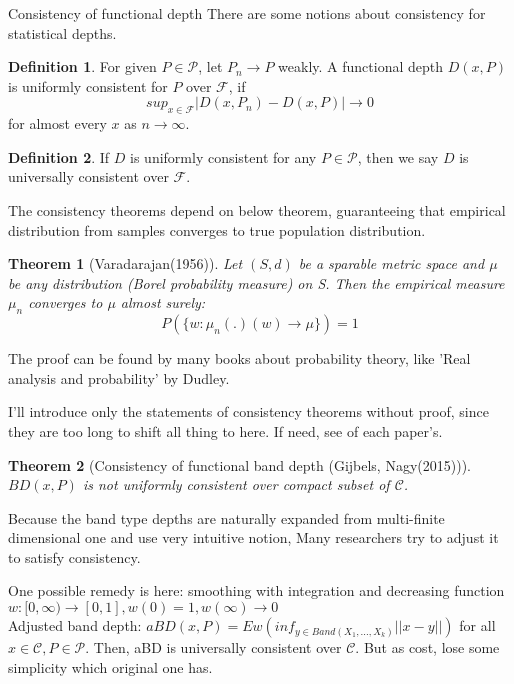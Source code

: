 \documentclass[aspectratio=169,ignorenonframetext,9pt]{beamer}
\theoremstyle{plain}
\newtheorem{thm}{Theorem}[section]
\theoremstyle{definition}
\newtheorem{defn}{Definition}[section]
\begin{document}
\begin{frame}{Consistency of functional depth}
There are some notions about consistency for statistical depths.

\begin{defn}
    For given $P\in\mathcal{P}$, let $P_n\rightarrow P$ weakly.
    A functional depth $D(x,P)$ is uniformly consistent for $P$ over $\mathcal{F}$,
    if
    \[sup_{x\in\mathcal{F}}|D(x,P_n)-D(x,P)|\rightarrow 0\]
    for almost every $x$ as $n\rightarrow\infty$.
\end{defn}
\begin{defn}
    If $D$ is uniformly consistent for any $P\in\mathcal{P}$,
    then we say $D$ is universally consistent over $\mathcal{F}$.
\end{defn}
    
The consistency theorems depend on below theorem, guaranteeing that
empirical distribution from samples converges to true population distribution.
\begin{thm}[Varadarajan(1956)]
    Let $(S,d)$ be a sparable metric space and $\mu$ be any distribution (Borel probability measure) on S.
    Then the empirical measure $\mu_n$ converges to $\mu$ almost surely:
    \[P(\{w:\mu_n(.)(w)\rightarrow\mu\})=1\]
\end{thm}
The proof can be found by many books about probability theory, like 'Real analysis and probability' by Dudley.

I'll introduce only the statements of consistency theorems without proof,
since they are too long to shift all thing to here. If need, see of each paper's.

\begin{thm}[Consistency of functional band depth (Gijbels, Nagy(2015))]
    $BD(x,P)$ is not uniformly consistent over compact subset of $\mathcal{C}$.
\end{thm}

Because the band type depths are naturally expanded from multi-finite dimensional one and 
use very intuitive notion, Many researchers try to adjust it to satisfy consistency.

One possible remedy is here: smoothing with integration and decreasing function $w:[0,\infty)\rightarrow[0,1],w(0)=1,w(\infty)\rightarrow 0$ \\
Adjusted band depth: \(aBD(x,P)=Ew(inf_{y\in Band(X_1,...,X_k)} ||x-y||)\) for all $x\in\mathcal{C},P\in\mathcal{P}$.
Then, aBD is universally consistent over $\mathcal{C}$. But as cost, lose some simplicity which original one has.


\end{frame}
\end{document}
